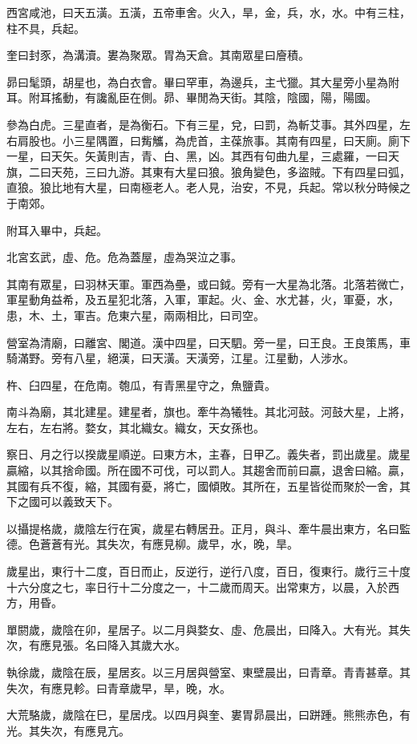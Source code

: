 西宮咸池，曰天五潢。五潢，五帝車舍。火入，旱，金，兵，水，水。中有三柱，柱不具，兵起。

奎曰封豕，為溝瀆。婁為聚眾。胃為天倉。其南眾星曰廥積。

昴曰髦頭，胡星也，為白衣會。畢曰罕車，為邊兵，主弋獵。其大星旁小星為附耳。附耳搖動，有讒亂臣在側。昴、畢閒為天街。其陰，陰國，陽，陽國。

參為白虎。三星直者，是為衡石。下有三星，兌，曰罰，為斬艾事。其外四星，左右肩股也。小三星隅置，曰觜觿，為虎首，主葆旅事。其南有四星，曰天廁。廁下一星，曰天矢。矢黃則吉，青、白、黑，凶。其西有句曲九星，三處羅，一曰天旗，二曰天苑，三曰九游。其東有大星曰狼。狼角變色，多盜賊。下有四星曰弧，直狼。狼比地有大星，曰南極老人。老人見，治安，不見，兵起。常以秋分時候之于南郊。

附耳入畢中，兵起。

北宮玄武，虛、危。危為蓋屋，虛為哭泣之事。

其南有眾星，曰羽林天軍。軍西為壘，或曰鉞。旁有一大星為北落。北落若微亡，軍星動角益希，及五星犯北落，入軍，軍起。火、金、水尤甚，火，軍憂，水，患，木、土，軍吉。危東六星，兩兩相比，曰司空。

營室為清廟，曰離宮、閣道。漢中四星，曰天駟。旁一星，曰王良。王良策馬，車騎滿野。旁有八星，絕漢，曰天潢。天潢旁，江星。江星動，人涉水。

杵、臼四星，在危南。匏瓜，有青黑星守之，魚鹽貴。

南斗為廟，其北建星。建星者，旗也。牽牛為犧牲。其北河鼓。河鼓大星，上將，左右，左右將。婺女，其北織女。織女，天女孫也。

察日、月之行以揆歲星順逆。曰東方木，主春，日甲乙。義失者，罰出歲星。歲星贏縮，以其捨命國。所在國不可伐，可以罰人。其趨舍而前曰贏，退舍曰縮。贏，其國有兵不復，縮，其國有憂，將亡，國傾敗。其所在，五星皆從而聚於一舍，其下之國可以義致天下。

以攝提格歲，歲陰左行在寅，歲星右轉居丑。正月，與斗、牽牛晨出東方，名曰監德。色蒼蒼有光。其失次，有應見柳。歲早，水，晚，旱。

歲星出，東行十二度，百日而止，反逆行，逆行八度，百日，復東行。歲行三十度十六分度之七，率日行十二分度之一，十二歲而周天。出常東方，以晨，入於西方，用昏。

單閼歲，歲陰在卯，星居子。以二月與婺女、虛、危晨出，曰降入。大有光。其失次，有應見張。名曰降入其歲大水。

執徐歲，歲陰在辰，星居亥。以三月居與營室、東壁晨出，曰青章。青青甚章。其失次，有應見軫。曰青章歲早，旱，晚，水。

大荒駱歲，歲陰在巳，星居戌。以四月與奎、婁胃昴晨出，曰跰踵。熊熊赤色，有光。其失次，有應見亢。

